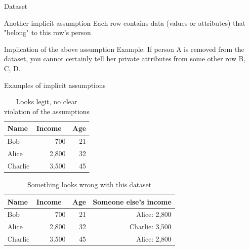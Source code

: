 \documentclass[12pt,aspectratio=169,handout]{beamer}
\begin{document}
\begin{frame}{Dataset}

\begin{block}{Another implicit assumption}
Each row contains data (values or attributes) that "belong" to this row's person
\end{block}


\begin{block}{Implication of the above assumption}
Example: If person A is removed from the dataset, you cannot certainly tell her private attributes from some other row B, C, D.
\end{block}



\end{frame}


\begin{frame}{Examples of implicit assumptions}

\begin{table}
\footnotesize
\begin{tabular}{lrr} \toprule
Name & Income & Age \\ \midrule
Bob & 700 & 21 \\
Alice & 2,800 & 32 \\
Charlie & 3,500 & 45 \\ \bottomrule
\end{tabular}
\caption{Looks legit, no clear violation of the assumptions}
\end{table}

\vspace{-1em}
\begin{table}
\footnotesize
\begin{tabular}{lrrr} \toprule
Name & Income & Age & Someone else's income \\ \midrule
Bob & 700 & 21 & Alice: 2,800\\
Alice & 2,800 & 32 & Charlie: 3,500 \\
Charlie & 3,500 & 45 & Alice: 2,800 \\ \bottomrule
\end{tabular}
\caption{Something looks wrong with this dataset}
\end{table}

\end{frame}
\end{document}
